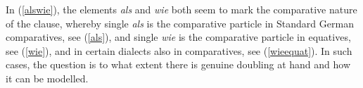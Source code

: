\ea
{}
\z
\z

In (\ref{alswie}), the elements \textit{als} and \textit{wie} both seem to mark the comparative nature of the clause, whereby single \textit{als} is the comparative particle in Standard German comparatives, see (\ref{als}), and single \textit{wie} is the comparative particle in equatives, see (\ref{wie}), and in certain dialects also in comparatives, see (\ref{wieequat}). In such cases, the question is to what extent there is genuine doubling at hand and how it can be modelled.

